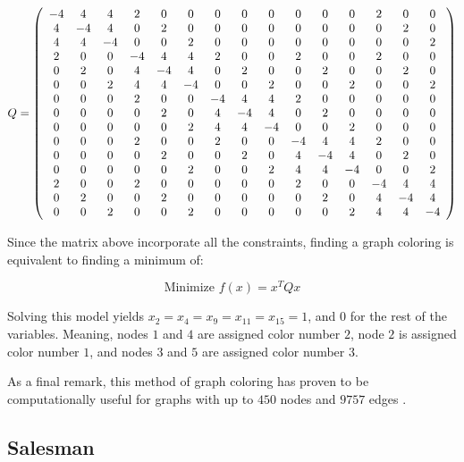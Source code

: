 $$
Q = 
\left(
\begin{array}{*{15}c}
-4 & 4 & 4 & 2 & 0 & 0 & 0 & 0 & 0 & 0 & 0 & 0 & 2 & 0 & 0 \\
4 & -4 & 4 & 0 & 2 & 0 & 0 & 0 & 0 & 0 & 0 & 0 & 0 & 2 & 0 \\
4 & 4 & -4 & 0 & 0 & 2 & 0 & 0 & 0 & 0 & 0 & 0 & 0 & 0 & 2 \\
2 & 0 & 0 & -4 & 4 & 4 & 2 & 0 & 0 & 2 & 0 & 0 & 2 & 0 & 0 \\
0 & 2 & 0 & 4 & -4 & 4 & 0 & 2 & 0 & 0 & 2 & 0 & 0 & 2 & 0 \\
0 & 0 & 2 & 4 & 4 & -4 & 0 & 0 & 2 & 0 & 0 & 2 & 0 & 0 & 2 \\
0 & 0 & 0 & 2 & 0 & 0 & -4 & 4 & 4 & 2 & 0 & 0 & 0 & 0 & 0 \\
0 & 0 & 0 & 0 & 2 & 0 & 4 & -4 & 4 & 0 & 2 & 0 & 0 & 0 & 0 \\
0 & 0 & 0 & 0 & 0 & 2 & 4 & 4 & -4 & 0 & 0 & 2 & 0 & 0 & 0 \\
0 & 0 & 0 & 2 & 0 & 0 & 2 & 0 & 0 & -4 & 4 & 4 & 2 & 0 & 0 \\
0 & 0 & 0 & 0 & 2 & 0 & 0 & 2 & 0 & 4 & -4 & 4 & 0 & 2 & 0 \\
0 & 0 & 0 & 0 & 0 & 2 & 0 & 0 & 2 & 4 & 4 & -4 & 0 & 0 & 2 \\
2 & 0 & 0 & 2 & 0 & 0 & 0 & 0 & 0 & 2 & 0 & 0 & -4 & 4 & 4 \\
0 & 2 & 0 & 0 & 2 & 0 & 0 & 0 & 0 & 0 & 2 & 0 & 4 & -4 & 4 \\
0 & 0 & 2 & 0 & 0 & 2 & 0 & 0 & 0 & 0 & 0 & 2 & 4 & 4 & -4 
\end{array}
\right)
$$

Since the matrix above incorporate all the constraints, finding a graph coloring is equivalent to finding a minimum of:

$$ \text{Minimize } f(x) = x^T Q x $$

Solving this model yields $x_2 = x_4 = x_9 = x_{11} = x_{15} = 1$, and $0$ for the rest of the variables. Meaning, nodes $1$ and $4$ are assigned color number $2$, node $2$ is assigned color number $1$, and nodes $3$ and $5$ are assigned color number $3$.

As a final remark, this method of graph coloring has proven to be computationally useful for graphs with up to $450$ nodes and $9757$ edges \cite{Kochenberger2005}.


\subsection{Salesman}


